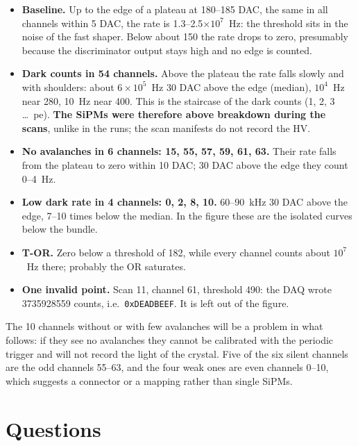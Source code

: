 \documentclass[11pt,a4paper]{article}
\begin{document}
\begin{itemize}
\item \textbf{Baseline.} Up to the edge of a plateau at 180--185 DAC, the same in all channels
  within 5 DAC, the rate is 1.3--2.5$\times10^7$~Hz: the threshold sits in the noise of the fast
  shaper. Below about 150 the rate drops to zero, presumably because the discriminator output
  stays high and no edge is counted.
\item \textbf{Dark counts in 54 channels.} Above the plateau the rate falls slowly and with
  shoulders: about $6\times10^5$~Hz 30 DAC above the edge (median), $10^4$~Hz near 280, 10~Hz
  near 400. This is the staircase of the dark counts (1, 2, 3 \ldots\ pe). \textbf{The SiPMs
  were therefore above breakdown during the scans}, unlike in the runs; the scan manifests do
  not record the HV.
\item \textbf{No avalanches in 6 channels: 15, 55, 57, 59, 61, 63.} Their rate falls from the
  plateau to zero within 10 DAC; 30 DAC above the edge they count 0--4~Hz.
\item \textbf{Low dark rate in 4 channels: 0, 2, 8, 10.} 60--90~kHz 30 DAC above the edge, 7--10
  times below the median. In the figure these are the isolated curves below the bundle.
\item \textbf{T-OR.} Zero below a threshold of 182, while every channel counts about
  $10^7$~Hz there; probably the OR saturates.
\item \textbf{One invalid point.} Scan 11, channel 61, threshold 490: the DAQ wrote 3735928559
  counts, i.e.\ \texttt{0xDEADBEEF}. It is left out of the figure.
\end{itemize}

The 10 channels without or with few avalanches will be a problem in what follows: if they see
no avalanches they cannot be calibrated with the periodic trigger and will not record the light
of the crystal. Five of the six silent channels are the odd channels 55--63, and the four weak
ones are even channels 0--10, which suggests a connector or a mapping rather than single SiPMs.

\section{Questions}
\end{document}
